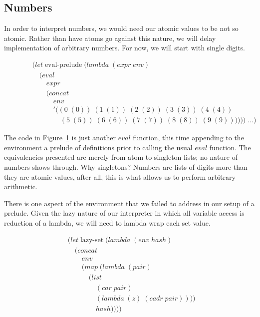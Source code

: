 \subsection{Numbers}
In order to interpret numbers, we would need our atomic values to be not so 
atomic. Rather than have atoms go against this nature, we will delay 
implementation of arbitrary numbers. For now, we will start with single 
digits.

\begin{figure}[htp]
\caption{}\label{fig:evalPrelude}
\begin{align*}
& (let \; \text{eval-prelude} \; (lambda \; (expr \; env)
\\& \quad (eval \; 
\\& \qquad expr
\\& \qquad (concat \; 
\\& \qquad \quad env \; 
\\& \qquad \quad '((0 \; (0)) \; (1 \; (1)) \; (2 \; (2)) \; (3 \; (3)) \; (4 \; (4)) \; 
\\& \qquad \qquad (5 \; (5)) \; (6 \; (6)) \; (7 \; (7)) \; (8 \; (8)) \; (9 \; (9)))))) \; \dots)
\end{align*}
\end{figure}

The code in Figure~\ref{fig:evalPrelude} is just another $eval$ function, this
time appending to the environment a prelude of definitions prior to calling the
usual $eval$ function. The equivalencies presented are merely from atom to
singleton lists; no nature of numbers shows through. Why singletons? Numbers
are lists of digits more than they are atomic values, after all, this is what
allows us to perform arbitrary arithmetic.

There is one aspect of the environment that we failed to address in our setup 
of a prelude. Given the lazy nature of our interpreter in which all variable
access is reduction of a lambda, we will need to lambda wrap each set value.

\begin{figure}[htp]
\caption{}\label{fig:lazySetDef}
\begin{align*}
& (let \; \text{lazy-set} \; (lambda \; (env \; hash)
\\& \quad (concat
\\& \qquad env
\\& \qquad (map \; (lambda \; (pair) \; 
\\& \qquad \quad (list \; 
\\& \qquad \qquad (car \; pair) \; 
\\& \qquad \qquad (lambda \; (z) \; (cadr \; pair)))) \; 
\\& \qquad \qquad hash))))
\end{align*}
\end{figure}

